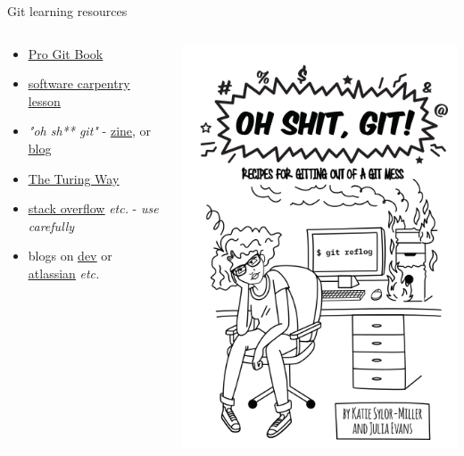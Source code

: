 \documentclass{beamer} %
\begin{document}
  \begin{frame}{Git learning resources}
    \begin{columns}
      \begin{column}{0.5\textwidth}
        \begin{itemize}
          \item \href{http://git-scm.com/book/en/v2}{\underline{Pro Git Book}}
          \item \href{http://swcarpentry.github.io/git-novice/}{\underline{software carpentry lesson}}
          \item \textit{"oh sh** git"} - \href{https://wizardzines.com/zines/oh-shit-git/}{\underline{zine}}, or \href{https://ohshitgit.com/}{\underline{blog}}
          \item \href{https://the-turing-way.netlify.app/reproducible-research/vcs.html}{\underline{The Turing Way}}
          \item \href{https://stackoverflow.com/}{\underline{stack overflow}} \textit{etc.} - \textit{use carefully}
          \item blogs on \href{https://dev.to/}{\underline{dev}} or \href{https://www.atlassian.com/git/tutorials}{\underline{atlassian}} \textit{etc.}
        \end{itemize}
      \end{column}
      \begin{column}{0.5\textwidth}
        \includegraphics[height=0.8\textheight]{ohshitgit.png}
      \end{column}
    \end{columns}
  \end{frame}
\end{document}

